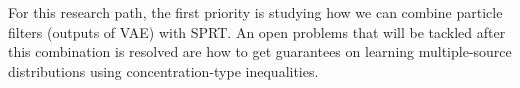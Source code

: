 \documentclass[english]{article}
\numberwithin{equation}{section}
\begin{document}
For this research path, the first priority is studying how we can combine particle filters (outputs of VAE) with SPRT. An open problems that will be tackled after this combination is resolved are how to get guarantees on learning multiple-source distributions using concentration-type inequalities.
\end{document}
